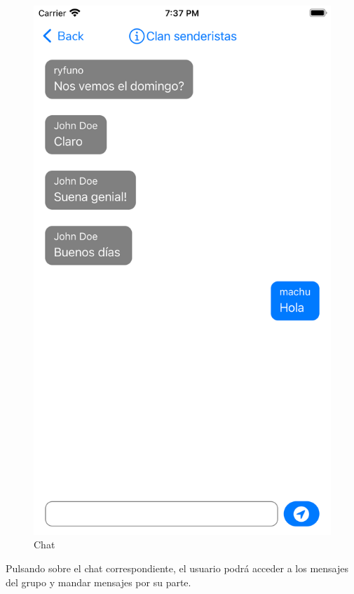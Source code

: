 \begin{appendices}
\begin{figure}[H]
\begin{minipage}{0.3\textwidth}
        \end{minipage}
        \begin{minipage}{0.3\textwidth}
            \centering
            \includegraphics[cframe=black 2pt,width=1\linewidth]{images/manual/ejemploChat.png}
        \end{minipage}
        \caption{Chat}
        \label{fig:my_label}

\end{figure}
Pulsando sobre el chat correspondiente, el usuario podrá acceder a los mensajes del grupo y mandar mensajes por su parte.


\end{appendices}
